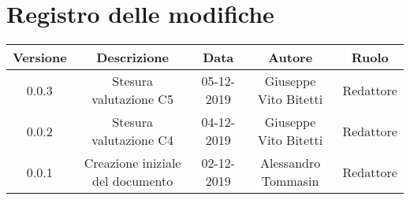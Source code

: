 \section*{Registro delle modifiche}

\begin{center}
	\begin{longtable}{|c|c|c|c|c|}
	\hline
	\rowcolor{lighter-grayer}
	\textbf{Versione} & \textbf{Descrizione} & \textbf{Data} & \textbf{Autore} & \textbf{Ruolo} \\
	\hline
	\endfirsthead

	\hline
	0.0.3 & Stesura valutazione C5 & 05-12-2019 & Giuseppe Vito Bitetti & Redattore \\
	\hline
	0.0.2 & Stesura valutazione C4 & 04-12-2019 & Giuseppe Vito Bitetti & Redattore \\
	\hline
	0.0.1 & Creazione iniziale del documento & 02-12-2019 & Alessandro Tommasin & Redattore \\
	\hline
	
	\end{longtable}
\end{center}
